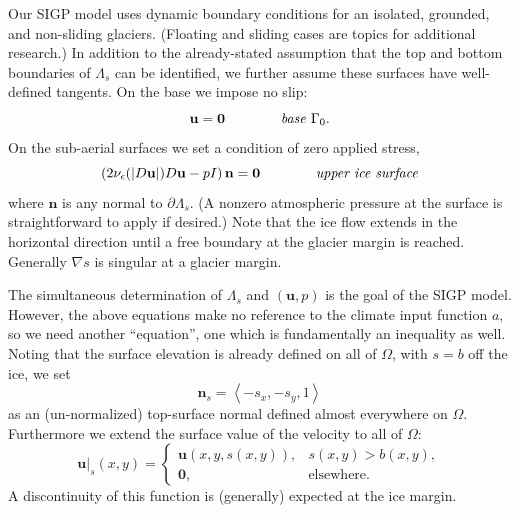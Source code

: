 \documentclass[letterpaper,final,12pt,reqno]{amsart}
\theoremstyle{claim}
\newcommand{\eps}{\epsilon}
\newcommand{\grad}{\nabla}
\newcommand{\bn}{\mathbf{n}}
\newcommand{\bu}{\mathbf{u}}
\newcommand{\bzero}{\bm{0}}
\newcommand{\bus}{\bu|_s}
\numberwithin{equation}{section}
\numberwithin{figure}{section}
\numberwithin{table}{section}
\numberwithin{theorem}{section}
\begin{document}
Our SIGP model uses dynamic boundary conditions for an isolated, grounded, and non-sliding glaciers.  (Floating and sliding cases are topics for additional research.)  In addition to the already-stated assumption that the top and bottom boundaries of $\Lambda_s$ can be identified, we further assume these surfaces have well-defined tangents.  On the base we impose no slip:
\begin{equation}
\bu = \bzero  \qquad\qquad \text{\emph{base} } \Gamma_0. \label{eq:basebc}
\end{equation}
On the sub-aerial surfaces we set a condition of zero applied stress,
\begin{equation}
\left(2 \nu_\eps(|D\bu|) D\bu - pI\right) \bn = \bzero  \qquad \qquad \text{\emph{upper ice surface}} \label{eq:topbc}
\end{equation}
where $\bn$ is any normal to $\partial \Lambda_s$.  (A nonzero atmospheric pressure at the surface is straightforward to apply if desired.)  Note that the ice flow extends in the horizontal direction until a free boundary at the glacier margin is reached.  Generally $\grad s$ is singular at a glacier margin.

The simultaneous determination of $\Lambda_s$ and $(\bu,p)$ is the goal of the SIGP model.  However, the above equations make no reference to the climate input function $a$, so we need another ``equation'', one which is fundamentally an inequality as well.  Noting that the surface elevation is already defined on all of $\Omega$, with $s=b$ off the ice, we set
\begin{equation}
\bn_s = \left<-s_x,-s_y,1\right> \label{eq:surfacenormal}
\end{equation}
as an (un-normalized) top-surface normal defined almost everywhere on $\Omega$.  Furthermore we extend the surface value of the velocity to all of $\Omega$:
\begin{equation}
\bus(x,y) = \begin{cases} \bu(x,y,s(x,y)), & s(x,y) > b(x,y), \\
                     \bzero, & \text{elsewhere}. \end{cases} \label{eq:surfacevelocity}
\end{equation}
A discontinuity of this function is (generally) expected at the ice margin.
\end{document}
